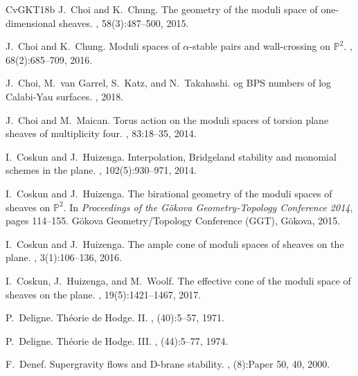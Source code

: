 \documentclass[12pt, a4paper]{amsart}
\begin{document}
\begin{thebibliography}{CvGKT18b}
J.~Choi and K.~Chung.
\newblock The geometry of the moduli space of one-dimensional sheaves.
, 58(3):487--500, 2015.

J.~Choi and K.~Chung.
\newblock Moduli spaces of $\alpha$-stable pairs and wall-crossing on
  $\mathbb{P}^2$.
, 68(2):685--709, 2016.


J.~Choi, M.~van Garrel, S.~Katz, and N.~Takahashi.
og {BPS} numbers of log {C}alabi-{Y}au surfaces.
, 2018.


J.~Choi and M.~Maican.
\newblock Torus action on the moduli spaces of torsion plane sheaves of
  multiplicity four.
, 83:18--35, 2014.



I.~Coskun and J.~Huizenga.
\newblock Interpolation, {B}ridgeland stability and monomial schemes in the
  plane.
, 102(5):930--971, 2014.

I.~Coskun and J.~Huizenga.
\newblock The birational geometry of the moduli spaces of sheaves on {$\mathbb{P}^2$}.
\newblock In {\em Proceedings of the {G}\"{o}kova {G}eometry-{T}opology
  {C}onference 2014}, pages 114--155. G\"{o}kova Geometry/Topology Conference
  (GGT), G\"{o}kova, 2015.

I.~Coskun and J.~Huizenga.
\newblock The ample cone of moduli spaces of sheaves on the plane.
, 3(1):106--136, 2016.

I.~Coskun, J.~Huizenga, and M.~Woolf.
\newblock The effective cone of the moduli space of sheaves on the plane.
, 19(5):1421--1467, 2017.


P.~Deligne.
\newblock Th\'{e}orie de {H}odge. {II}.
, (40):5--57, 1971.

P.~Deligne.
\newblock Th\'{e}orie de {H}odge. {III}.
, (44):5--77, 1974.

F.~Denef.
\newblock Supergravity flows and {D}-brane stability.
, (8):Paper 50, 40, 2000.


\end{thebibliography}
\end{document}
